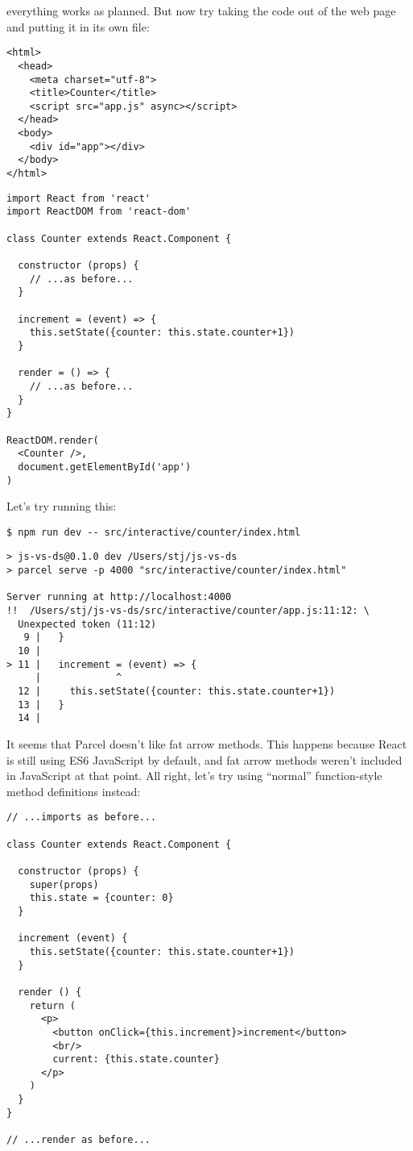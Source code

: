 \noindent
everything works as planned.
But now try taking the code out of the web page and putting it in its own file:

\begin{verbatim}
<html>
  <head>
    <meta charset="utf-8">
    <title>Counter</title>
    <script src="app.js" async></script>
  </head>
  <body>
    <div id="app"></div>
  </body>
</html>
\end{verbatim}

\begin{verbatim}
import React from 'react'
import ReactDOM from 'react-dom'

class Counter extends React.Component {

  constructor (props) {
    // ...as before...
  }

  increment = (event) => {
    this.setState({counter: this.state.counter+1})
  }

  render = () => {
    // ...as before...
  }
}

ReactDOM.render(
  <Counter />,
  document.getElementById('app')
)
\end{verbatim}

Let's try running this:

\begin{verbatim}
$ npm run dev -- src/interactive/counter/index.html
\end{verbatim}

\begin{verbatim}
> js-vs-ds@0.1.0 dev /Users/stj/js-vs-ds
> parcel serve -p 4000 "src/interactive/counter/index.html"

Server running at http://localhost:4000
!!  /Users/stj/js-vs-ds/src/interactive/counter/app.js:11:12: \
  Unexpected token (11:12)
   9 |   }
  10 |
> 11 |   increment = (event) => {
     |             ^
  12 |     this.setState({counter: this.state.counter+1})
  13 |   }
  14 |
\end{verbatim}

It seems that Parcel doesn't like fat arrow methods.
This happens because React is still using ES6 JavaScript by default,
and fat arrow methods weren't included in JavaScript at that point.
All right, let's try using ``normal'' function-style method definitions instead:

\begin{verbatim}
// ...imports as before...

class Counter extends React.Component {

  constructor (props) {
    super(props)
    this.state = {counter: 0}
  }

  increment (event) {
    this.setState({counter: this.state.counter+1})
  }

  render () {
    return (
      <p>
        <button onClick={this.increment}>increment</button>
        <br/>
        current: {this.state.counter}
      </p>
    )
  }
}

// ...render as before...
\end{verbatim}

